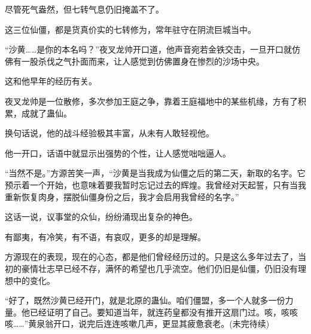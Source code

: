 \begin{this_body}
尽管死气盎然，但七转气息仍旧掩盖不了。

这三位仙僵，都是货真价实的七转修为，常年驻守在阴流巨城当中。

“沙黄……是你的本名吗？”夜叉龙帅开口道，他声音宛若金铁交击，一旦开口就仿佛有一股杀伐之气扑面而来，让人感觉到仿佛置身在惨烈的沙场中央。

这和他早年的经历有关。

夜叉龙帅是一位散修，多次参加王庭之争，靠着王庭福地中的某些机缘，方有了积累，成就了蛊仙。

换句话说，他的战斗经验极其丰富，从未有人敢轻视他。

他一开口，话语中就显示出强势的个性，让人感觉咄咄逼人。

“当然不是。”方源苦笑一声，“沙黄是当我成为仙僵之后的第二天，新取的名字。它预示着一个开始，也意味着要我暂时忘记过去的辉煌。我曾经对天起誓，只有当我重新恢复肉身，摆脱仙僵身份之后，我才会启用我曾经的名字。”

这话一说，议事堂的众仙，纷纷涌现出复杂的神色。

有鄙夷，有冷笑，有不语，有哀叹，更多的却是理解。

方源现在的表现，现在的心态，都是他们曾经经历过的。只是这么多年过去了，当初的豪情壮志早已经不存，满怀的希望也几乎流空。他们仍旧是仙僵，仍旧没有理想中的变化。

“好了，既然沙黄已经开门，就是北原的蛊仙。咱们僵盟，多一个人就多一份力量。他已经证明了自己。要知道当年，就连药皇都没有推开这扇门过。咳，咳咳咳……”黄泉翁开口，说完后连连咳嗽几声，更显其疲惫衰老。(未完待续)

\end{this_body}

